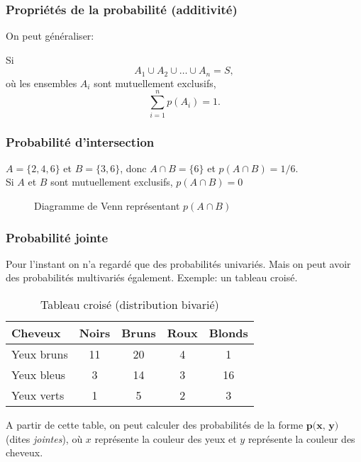 \documentclass{beamer}
\begin{document}
\begin{frame}
    \frametitle{Propriétés de la probabilité (additivité)}
    On peut généraliser:

    \pause

    \vfill

    Si 
    \[A_1 \cup A_2 \cup \ldots \cup A_n = S,\]
    où les ensembles $A_i$ sont mutuellement exclusifs,
    \[\sum_{i=1}^{n} p(A_i) = 1.\]
\end{frame}




\begin{frame}
    \frametitle{Probabilité d'intersection}
    $A = \{2,4,6\}$ et $B = \{3,6\}$, donc $A \cap B = \{6\}$ et $p(A \cap B) = 1/6$.\\
    \vfill
    \pause
    Si $A$ et $B$ sont mutuellement exclusifs, $p(A \cap B) = 0$    
    \begin{figure}
      \centering
      
      \caption{Diagramme de Venn représentant $p(A \cap B)$}
    \end{figure}
\end{frame}


\begin{frame}
    \frametitle{Probabilité jointe}
    Pour l'instant on n'a regardé que des probabilités univariés. Mais on peut avoir des probabilités multivariés également.
    Exemple: un tableau croisé.
    \pause
    \begin{table}[h!]
      \centering
      \begin{tabular}{|l|c|c|c|c|}
        \hline
        Cheveux & Noirs & Bruns & Roux & Blonds \\
        \hline\hline
        Yeux bruns & 11 & 20 & 4 & 1 \\
        Yeux bleus & 3 & 14 & 3 & 16 \\
        Yeux verts & 1 & 5 & 2 & 3 \\
        \hline
      \end{tabular}
      \caption{Tableau croisé (distribution bivarié)}
    \end{table}
    \pause
    A partir de cette table, on peut calculer des probabilités de la forme $\textbf{p(x, y)}$ (dites \emph{jointes}),
    où $x$ représente la couleur des yeux et $y$ représente la couleur des cheveux.
\end{frame}
\end{document}
